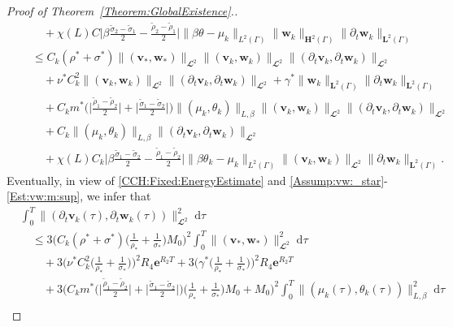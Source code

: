 \documentclass[10pt,reqno]{amsart}
\theoremstyle{remark}
\numberwithin{equation}{section}
\newcommand{\Bigabs}[1]{\Big| #1 \Big|}
\newcommand{\norm}[1]{\| #1 \|}
\newcommand{\bv}{\mathbf{v}}
\newcommand{\bw}{\mathbf{w}}
\newcommand{\dtau}{\;\mathrm d\tau}
\newcommand{\delt}{\partial_{t}}
\newcommand{\e}{\mathbf{e}}
\newcommand{\Ga}{\Gamma}
\begin{document}
\begin{proof}[Proof of Theorem~\ref{Theorem:GlobalExistence}.]
\begin{align}
    &\qquad + \chi(L)C\Bigabs{\beta\frac{\tilde\sigma_2 - \tilde\sigma_1}{2} - \frac{\tilde\rho_2 - \tilde\rho_1}{2}}\norm{\beta\theta - \mu_k}_{L^2(\Ga)}\norm{\bw_k}_{\mathbf{H}^2(\Ga)}\norm{\delt\bw_k}_{\mathbf{L}^2(\Ga)} \nonumber \\[0.4em]
    &\quad\leq C_k(\rho^\ast + \sigma^\ast)\norm{(\bv_\ast,\bw_\ast)}_{\mathbfcal{L}^2}\norm{(\bv_k,\bw_k)}_{\mathbfcal{L}^2}\norm{(\delt\bv_k,\delt\bw_k)}_{\mathbfcal{L}^2} \nonumber \\[0.3em]
    &\qquad + \nu^\ast C_k^2\norm{(\bv_k,\bw_k)}_{\mathbfcal{L}^2}\norm{(\delt\bv_k,\delt\bw_k)}_{\mathbfcal{L}^2} + \gamma^\ast\norm{\bw_k}_{\mathbf{L}^2(\Ga)}\norm{\delt\bw_k}_{\mathbf{L}^2(\Ga)} \nonumber \\[0.3em]
    &\qquad + C_km^\ast\bigg(\Bigabs{\frac{\tilde\rho_1 - \tilde\rho_2}{2}} + \Bigabs{\frac{\tilde\sigma_1 - \tilde\sigma_2}{2}}\bigg)\norm{(\mu_k, \theta_k)}_{L,\beta}\norm{(\bv_k,\bw_k)}_{\mathbfcal{L}^2}\norm{(\delt\bv_k,\delt\bw_k)}_{\mathbfcal{L}^2} \nonumber \\[0.3em]
    &\qquad + C_k\norm{(\mu_k,\theta_k)}_{L,\beta}\norm{(\delt\bv_k,\delt\bw_k)}_{\mathbfcal{L}^2} \nonumber \\[0.3em]
    &\qquad + \chi(L)C_k\Bigabs{\beta\frac{\tilde\sigma_1 - \tilde\sigma_2}{2} - \frac{\tilde\rho_1 - \tilde\rho_2}{2}}\norm{\beta\theta_k - \mu_k}_{L^2(\Ga)}\norm{(\bv_k,\bw_k)}_{\mathbfcal{L}^2}\norm{\delt\bw_k}_{\mathbf{L}^2(\Ga)}. \nonumber
\end{align}
Eventually, in view of \eqref{CCH:Fixed:EnergyEstimate} and \eqref{Assump:vw:_star}-\eqref{Est:vw:m:sup}, we infer that
\begin{align}\label{Est:delt:vw:m:int}
    &\int_0^T \norm{(\delt\bv_k(\tau),\delt\bw_k(\tau))}_{\mathbfcal{L}^2}^2\dtau \nonumber\\
    &\quad\leq 3\Big(C_k(\rho^\ast + \sigma^\ast)\Big(\frac{1}{\rho_\ast} + \frac{1}{\sigma_\ast}\Big)M_0\Big)^2\int_0^T\norm{(\bv_\ast,\bw_\ast)}_{\mathbfcal{L}^2}^2\dtau  \nonumber\\
    &\qquad + 3\Big(\nu^\ast C_k^2\Big(\frac{1}{\rho_\ast} + \frac{1}{\sigma_\ast}\Big)\Big)^2R_4\e^{R_2T} + 3\Big(\gamma^\ast\Big(\frac{1}{\rho_\ast} + \frac{1}{\sigma_\ast}\Big)\Big)^2R_4\e^{R_2T} \nonumber \\
    &\qquad + 3\Big(C_km^\ast\bigg(\Bigabs{\frac{\tilde\rho_1 - \tilde\rho_2}{2}} + \Bigabs{\frac{\tilde\sigma_1 - \tilde\sigma_2}{2}}\bigg)\Big(\frac{1}{\rho_\ast} + \frac{1}{\sigma_\ast}\Big)M_0 + M_0\Big)^2\int_0^T \norm{(\mu_k(\tau),\theta_k(\tau))}_{L,\beta}^2\dtau \nonumber \\

\end{align}
\end{proof}
\end{document}
